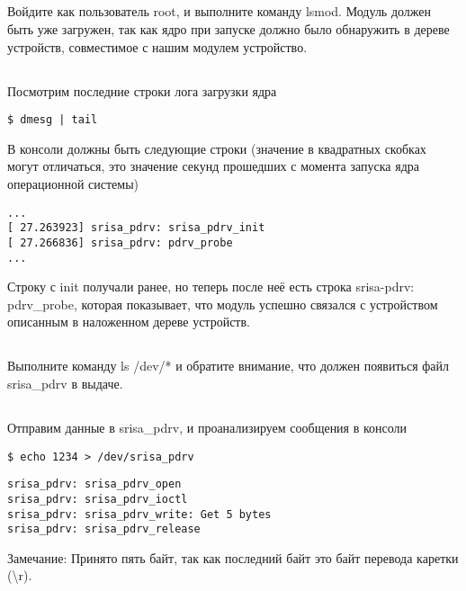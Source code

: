 \subsection{}Войдите как пользователь root, и выполните команду lsmod.
Модуль должен быть уже загружен, так как ядро при запуске должно было обнаружить в дереве устройств, совместимое с нашим модулем устройство. 

\subsection{}Посмотрим последние строки лога загрузки ядра
\begin{lstlisting}[style=bash]
$ dmesg | tail
\end{lstlisting}
В консоли должны быть следующие строки (значение в квадратных скобках могут отличаться, это значение секунд прошедших с момента запуска ядра операционной системы)
\begin{lstlisting}[style=stdout]
...
[ 27.263923] srisa_pdrv: srisa_pdrv_init
[ 27.266836] srisa_pdrv: pdrv_probe
...
\end{lstlisting}

Строку с init получали ранее, но теперь после неё есть строка srisa-pdrv: pdrv\_probe, которая показывает, что  модуль успешно связался с устройством описанным в наложенном дереве устройств.

\subsection{}Выполните команду ls /dev/* и обратите внимание, что должен появиться файл srisa\_pdrv в выдаче.

\subsection{}Отправим данные в srisa\_pdrv, и проанализируем сообщения в консоли
\begin{lstlisting}[style=bash]
$ echo 1234 > /dev/srisa_pdrv
\end{lstlisting}
\begin{lstlisting}[style=stdout]
srisa_pdrv: srisa_pdrv_open
srisa_pdrv: srisa_pdrv_ioctl
srisa_pdrv: srisa_pdrv_write: Get 5 bytes
srisa_pdrv: srisa_pdrv_release
\end{lstlisting} 

\vspace{3mm}
\begin{Notes}{Замечание:} 
	Принято пять байт, так как последний байт это байт перевода каретки (\textbackslash{}r). 
\end{Notes}
	
